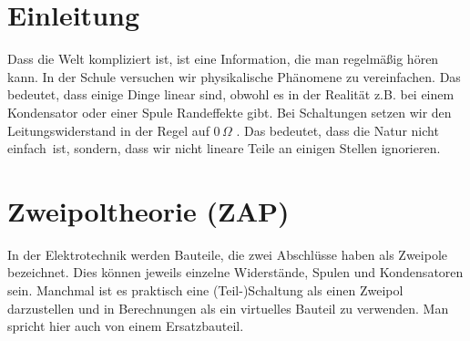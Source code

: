 % 
\section{Einleitung}
Dass die Welt kompliziert ist, ist eine Information, die man regelmäßig hören kann. In der Schule versuchen wir physikalische Phänomene zu vereinfachen. Das bedeutet, dass einige Dinge linear sind, obwohl es in der Realität z.B. bei einem Kondensator oder einer Spule Randeffekte gibt. Bei Schaltungen setzen wir den Leitungswiderstand in der Regel auf $0\, \Omega$ . Das bedeutet, dass die Natur nicht \glq einfach\grq \ ist, sondern, dass wir nicht lineare Teile an einigen Stellen ignorieren.


\section[Zweipole]{Zweipoltheorie (ZAP)}
In der Elektrotechnik werden Bauteile, die zwei Abschlüsse haben als Zweipole bezeichnet. Dies können jeweils einzelne Widerstände, Spulen und Kondensatoren sein. Manchmal ist es praktisch eine (Teil-)Schaltung als einen Zweipol darzustellen und in Berechnungen als ein virtuelles Bauteil zu verwenden. Man spricht hier auch von einem Ersatzbauteil.

